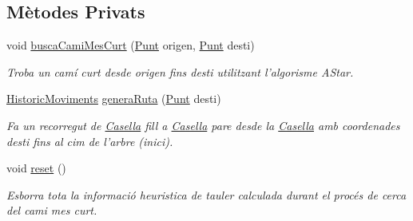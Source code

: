 \subsection*{Mètodes Privats}
\begin{DoxyCompactItemize}
\item 
void \hyperlink{classlogica_1_1algoritmica_1_1_a_estrella_1_1_buscador_cami_minim_a678eaf8cc032feaea8ea8975cd381a10}{busca\+Cami\+Mes\+Curt} (\hyperlink{classlogica_1_1_punt}{Punt} origen, \hyperlink{classlogica_1_1_punt}{Punt} desti)
\begin{DoxyCompactList}\small\item\em Troba un camí curt desde origen fins desti utilitzant l'algorisme A\+Star. \end{DoxyCompactList}\item 
\hyperlink{classlogica_1_1historic__moviments_1_1_historic_moviments}{Historic\+Moviments} \hyperlink{classlogica_1_1algoritmica_1_1_a_estrella_1_1_buscador_cami_minim_a99382c4518dfe3adff49fb8cbef27705}{genera\+Ruta} (\hyperlink{classlogica_1_1_punt}{Punt} desti)
\begin{DoxyCompactList}\small\item\em Fa un recorregut de \hyperlink{classlogica_1_1algoritmica_1_1_casella}{Casella} fill a \hyperlink{classlogica_1_1algoritmica_1_1_casella}{Casella} pare desde la \hyperlink{classlogica_1_1algoritmica_1_1_casella}{Casella} amb coordenades desti fins al cim de l'arbre (inici). \end{DoxyCompactList}\item 
void \hyperlink{classlogica_1_1algoritmica_1_1_a_estrella_1_1_buscador_cami_minim_a78037be2355dc5a782185a0d1662ce5c}{reset} ()
\begin{DoxyCompactList}\small\item\em Esborra tota la informació heuristica de tauler calculada durant el procés de cerca del cami mes curt. \end{DoxyCompactList}\end{DoxyCompactItemize}
